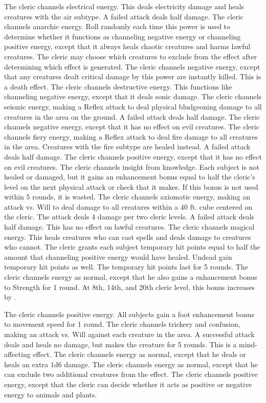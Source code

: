 The cleric channels electrical energy.
This deals electricity damage and heals creatures with the air subtype.
A failed attack deals half damage.
The cleric channels anarchic energy.
Roll randomly each time this power is used to determine whether it functions as channeling negative energy or channeling positive energy, except that it always heals chaotic creatures and harms lawful creatures.
The cleric may choose which creatures to exclude from the effect after determining which effect is generated.
The cleric channels negative energy, except that any creatures dealt critical damage by this power are instantly killed.
This is a death effect.
The cleric channels destructive energy.
This functions like channeling negative energy, except that it deals sonic damage.
The cleric channels seismic energy, making a Reflex attack to deal physical bludgeoning damage to all creatures in the area on the ground.
A failed attack deals half damage.
The cleric channels negative energy, except that it has no effect on evil creatures.
The cleric channels fiery energy, making a Reflex attack to deal fire damage to all creatures in the area.
Creatures with the fire subtype are healed instead.
A failed attack deals half damage.
The cleric channels positive energy, except that it has no effect on evil creatures.
The cleric channels insight from knowledge.
Each subject is not healed or damaged, but it gains an enhancement bonus equal to half the cleric's level on the next physical attack or check that it makes.
If this bonus is not used within 5 rounds, it is wasted.
The cleric channels axiomatic energy, making an attack vs. Will to deal damage to all creatures within a 40 ft.
cube centered on the cleric.
The attack deals 4 damage per two cleric levels.
A failed attack deals half damage.
This has no effect on lawful creatures.
The cleric channels magical energy.
This heals creatures who can cast spells and deals damage to creatures who cannot.
The cleric grants each subject temporary hit points equal to half the amount that channeling positive energy would have healed.
Undead gain temporary hit points as well.
The temporary hit points last for 5 rounds.
The cleric channels energy as normal, except that he also gains a  enhancement bonus to Strength for 1 round.
At 8th, 14th, and 20th cleric level, this bonus increases by .

The cleric channels positive energy.
All subjects gain a  foot enhancement bonus to movement speed for 1 round.
The cleric channels trickery and confusion, making an attack vs. Will against each creature in the area.
A successful attack deals and heals no damage, but makes the creature \bewildered for 5 rounds.
This is a mind-affecting effect.
The cleric channels energy as normal, except that he deals or heals an extra 1d6 damage.
The cleric channels energy as normal, except that he can exclude two additional creatures from the effect.
The cleric channels positive energy, except that the cleric can decide whether it acts as positive or negative energy to animals and plants.

